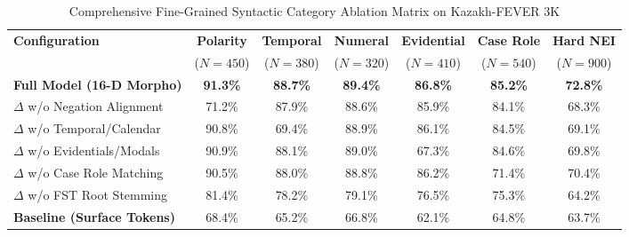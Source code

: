 \begin{table}[htbp]
\centering
\caption{Comprehensive Fine-Grained Syntactic Category Ablation Matrix on Kazakh-FEVER 3K}
\label{tab:app_ablation_fine_grained}
\small
\setlength{\tabcolsep}{4.2pt}
\begin{tabular}{lcccccc}
\toprule
\textbf{Configuration} & \textbf{Polarity} & \textbf{Temporal} & \textbf{Numeral} & \textbf{Evidential} & \textbf{Case Role} & \textbf{Hard NEI} \\
& ($N=450$) & ($N=380$) & ($N=320$) & ($N=410$) & ($N=540$) & ($N=900$) \\
\midrule
\textbf{Full Model (16-D Morpho)} & \textbf{91.3\%} & \textbf{88.7\%} & \textbf{89.4\%} & \textbf{86.8\%} & \textbf{85.2\%} & \textbf{72.8\%} \\
$\Delta$ w/o Negation Alignment     & 71.2\% & 87.9\% & 88.6\% & 85.9\% & 84.1\% & 68.3\% \\
$\Delta$ w/o Temporal/Calendar      & 90.8\% & 69.4\% & 88.9\% & 86.1\% & 84.5\% & 69.1\% \\
$\Delta$ w/o Evidentials/Modals     & 90.9\% & 88.1\% & 89.0\% & 67.3\% & 84.6\% & 69.8\% \\
$\Delta$ w/o Case Role Matching     & 90.5\% & 88.0\% & 88.8\% & 86.2\% & 71.4\% & 70.4\% \\
$\Delta$ w/o FST Root Stemming      & 81.4\% & 78.2\% & 79.1\% & 76.5\% & 75.3\% & 64.2\% \\
\midrule
\textbf{Baseline (Surface Tokens)} & 68.4\% & 65.2\% & 66.8\% & 62.1\% & 64.8\% & 63.7\% \\
\bottomrule
\end{tabular}
\end{table}

